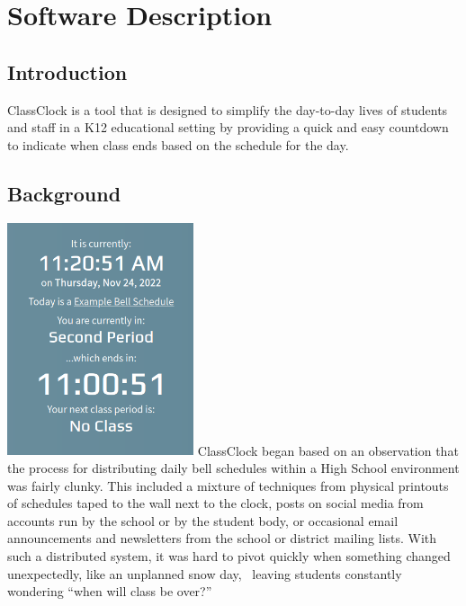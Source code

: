 \documentclass{article}
\begin{document}
\newpage
\setcounter{tocdepth}{3}
\tableofcontents

\bigskip


\bigskip


\bigskip


\bigskip

\clearpage
\bigskip

\section{Software Description}
\subsection{Introduction}
{ClassClock is a tool that is designed to simplify the day-to-day lives of students and staff in a K12 educational
setting by providing a quick and easy countdown to indicate when class ends based on the schedule for the day.}

\subsection{Background}
\includegraphics[width=2.1575in,height=2.6972in]{Mini20Manual-img002.png}
{ClassClock began based on an observation that the process for distributing daily bell schedules within a High School
environment was fairly clunky. This included a mixture of techniques from physical printouts of schedules taped to the
wall next to the clock, posts on social media from accounts run by the school or by the student body, or occasional
email announcements and newsletters from the school or district mailing lists. With such a distributed system, it was
hard to pivot quickly when something changed unexpectedly, like an unplanned snow day, \ leaving students constantly
wondering “when will class be over?”}
\end{document}
